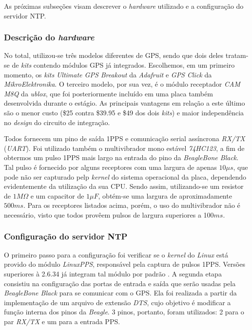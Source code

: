 \vspace{12pt}

As próximas subseções visam descrever o \textit{hardware} utilizado e a
configuração do servidor NTP.

\subsubsection{Descrição do \textit{hardware}}

No total, utilizou-se três modelos diferentes de GPS, sendo que dois deles
tratam-se de \textit{kits} contendo módulos GPS já integrados. Escolhemos, em um
primeiro momento, os \textit{kits} \textit{Ultimate GPS Breakout} da
\textit{Adafruit} e \textit{GPS Click} da \textit{MikroElektronika}. O terceiro
modelo, por sua vez, é o módulo receptador \textit{CAM M8Q} da \textit{ublox},
que foi posteriormente incluído em uma placa também desenvolvida durante o
estágio. As principais vantagens em relação a este último são o menor custo
(\$25 contra \$39.95 e \$49 dos dois \textit{kits}) e maior independência
no \textit{design} do circuito de integração.

\vspace{12pt}

Todos fornecem um pino de saída 1PPS e comunicação serial assíncrona
\textit{RX/TX} (\textit{UART}). Foi utilizado também o multivibrador mono
estável \textit{74HC123}, a fim de obtermos um pulso 1PPS mais largo na entrada
do pino da \textit{BeagleBone Black}. Tal pulso é fornecido por alguns
receptores com uma largura de apenas \(10\mu s\), que pode não ser capturado
pelp \textit{kernel} do sistema operacional da placa, dependendo evidentemente
da utilização da sua CPU. Sendo assim, utilizando-se um resistor de \(1M\Omega\)
e um capacitor de \(1\mu F\), obtém-se uma largura de aproximadamente \(500
ms\). Para os receptores listados acima, porém, o uso do multivibrador não é
necessário, visto que todos provêem pulsos de largura superiores a 100\(ms\).

\subsubsection{Configuração do servidor NTP}

O primeiro passo para a configuração foi verificar se o \textit{kernel} do
\textit{Linux} está provido do módulo \textit{LinuxPPS}, responsável pela
captura de pulsos 1PPS. Versões superiores à 2.6.34 já integram tal módulo por
padrão \cite{linuxpps}. A segunda etapa consistiu na configuração das portas de
entrada e saída que serão usadas pela \textit{BeagleBone Black} para se comunicar com o
GPS. Ela foi realizada a partir da implementação de um arquivo de extensão
\textit{DTS}, cujo objetivo é modificar a função interna dos pinos da
\textit{Beagle}. 3 pinos, portanto, foram utilizados: 2 para o par
\textit{RX/TX} e um para a entrada PPS. 

